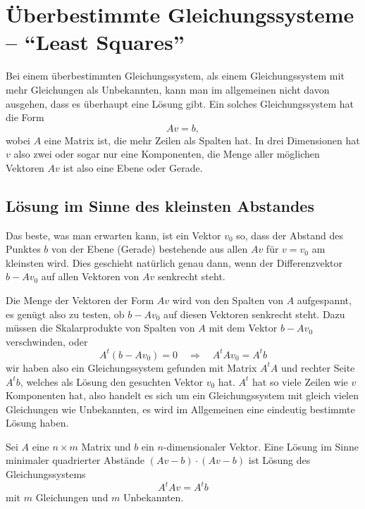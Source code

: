 %
%
%
\section{Überbestimmte Gleichungssysteme -- ``Least Squares''%
\label{section:ueberbestimmt}}
Bei einem überbestimmten Gleichungssystem, als einem Gleichungssystem
mit mehr Gleichungen als Unbekannten, kann man im allgemeinen nicht davon
ausgehen, dass es überhaupt eine Lösung gibt.
Ein solches Gleichungssystem hat die Form
\[
A v= b,
\]
wobei $A$ eine Matrix ist, die mehr Zeilen als Spalten hat.
In drei Dimensionen hat $v$ also zwei oder sogar nur eine Komponenten,
die Menge aller möglichen Vektoren $Av$ ist also eine Ebene oder
Gerade.

%
%
\subsection{Lösung im Sinne des kleinsten Abstandes}
Das beste, was man erwarten kann, ist ein Vektor $v_0$ so, dass
der Abstand des Punktes $ b$ von der Ebene (Gerade) bestehende
aus allen $Av$ für $v=v_0$ am kleinsten wird.
Dies geschieht
natürlich genau dann, wenn der Differenzvektor $b-Av_0$ auf
allen Vektoren von $Av$ senkrecht steht.

Die Menge der Vektoren der Form $Av$ wird von den Spalten von $A$
aufgespannt, es genügt also zu testen, ob $b-Av_0$ auf diesen
Vektoren senkrecht steht.
Dazu müssen die Skalarprodukte von
Spalten von $A$ mit dem Vektor $b-Av_0$ verschwinden, oder
\[
A^t(b-Av_0)=0
\quad
\Rightarrow
\quad
A^tAv_0=A^tb
\]
wir haben also ein Gleichungssystem gefunden mit Matrix $A^tA$ und
rechter Seite $A^tb$, welches als Lösung den gesuchten Vektor
$v_0$ hat.
$A^t$ hat so viele Zeilen wie $v$ Komponenten hat, also
handelt es sich um ein Gleichungssystem mit gleich vielen Gleichungen
wie Unbekannten, es wird im Allgemeinen eine eindeutig bestimmte
Lösung haben.

\begin{satz} Sei $A$ eine $n\times m$ Matrix und $b$ ein $n$-dimensionaler
Vektor.
Eine Lösung im Sinne minimaler quadrierter Abstände
$
(Av-b)\cdot(Av-b)
$
ist Lösung des Gleichungssystems
\[
A^tAv=A^tb
\]
mit $m$ Gleichungen und $m$ Unbekannten.
\end{satz}

